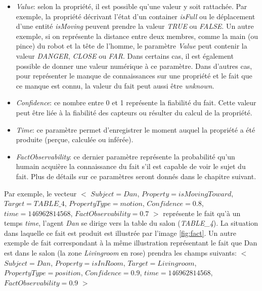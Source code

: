 \documentclass[a4paper,11pt,twoside]{StyleThese}
\begin{document}
\begin{itemize}
\item \textit{Value}: selon la propriété, il est possible qu'une valeur y soit rattachée. Par exemple, la propriété décrivant l'état d'un container \textit{isFull} ou le déplacement d'une entité \textit{isMoving} peuvent prendre la valeur \textit{TRUE} ou \textit{FALSE}. Un autre exemple, si on représente la distance entre deux membres, comme la main (ou pince) du robot et la tête de l'homme, le paramètre \textit{Value} peut contenir la valeur \textit{DANGER}, \textit{CLOSE} ou \textit{FAR}. Dans certains cas, il est également possible de donner une valeur numérique à ce paramètre.
Dans d'autres cas, pour représenter le manque de connaissances sur une propriété et le fait que ce manque est connu, la valeur du fait peut aussi être \textit{unknown}.
\item \textit{Confidence}: ce nombre entre 0 et 1 représente la fiabilité du fait. Cette valeur peut être liée à la fiabilité des capteurs ou résulter du calcul de la propriété.
\item \textit{Time}: ce paramètre permet d'enregistrer le moment auquel la propriété a été produite (perçue, calculée ou inférée).
\item \textit{FactObservability}: ce dernier paramètre représente la probabilité qu'un humain acquière la connaissance du fait s'il est capable de voir le sujet du fait. Plus de détails sur ce paramètres seront donnés dans le chapitre suivant.
\end{itemize}

Par exemple, le vecteur 
$<$ $Subject = Dan$, $Property = isMovingToward$, $Target = TABLE\_4$, $PropertyType = motion$, $Confidence = 0.8$, $time = 146962814568$, $FactObservability = 0.7$ $>$ représente le fait qu'à un temps \textit{time}, l'agent \textit{Dan} se dirige vers la table du salon (\textit{TABLE\_4}). La situation dans laquelle ce fait est produit est illustrée par l'image \ref{fig:fact}.
Un autre exemple de fait correspondant à la même illustration représentant le fait que Dan est dans le salon (la zone \textit{Livingroom} en rose) prendra les champs suivants:
$<$ $Subject = Dan$, $Property = isInRoom$, $Target = Livingroom$, $PropertyType = position$, $Confidence = 0.9$, $time = 146962814568$, $FactObservability = 0.9$ $>$
\end{document}

